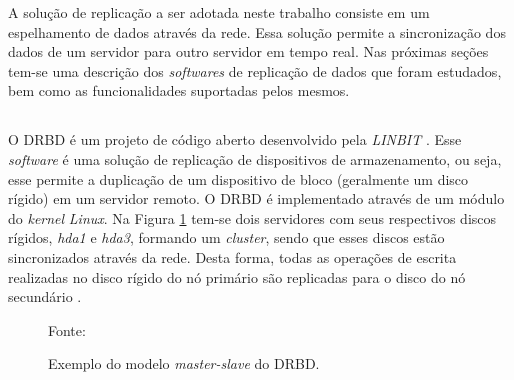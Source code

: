 A solução de replicação a ser adotada neste trabalho consiste em um espelhamento de dados através da rede. Essa solução permite a sincronização 
dos dados de um servidor para outro servidor em tempo real.
Nas próximas seções tem-se uma descrição dos \textit{softwares} de replicação de dados que foram estudados, bem como as funcionalidades 
suportadas pelos mesmos.


\subsection{}
\label{section:drbd}
O \ac{DRBD} é um projeto de código aberto desenvolvido pela \textit{LINBIT} \cite{drbd}.
Esse \textit{software} é uma solução de replicação de dispositivos de armazenamento, ou seja, esse permite a duplicação de um dispositivo de bloco 
(geralmente um disco rígido) em um servidor remoto. O \ac{DRBD} é implementado através de um módulo do \textit{kernel} \textit{Linux}. 
Na Figura \ref{fig:drbd_basic} tem-se dois servidores com seus respectivos discos rígidos, \textit{hda1} e 
\textit{hda3}, formando um \textit{cluster}, sendo que esses discos estão sincronizados através da rede. Desta forma, todas as operações de escrita 
realizadas no disco rígido do nó primário são replicadas para o disco do nó secundário \cite{zaminhani2008}.

\begin{figure}[h!]
 \centering
 \caption{Exemplo do modelo \textit{master-slave} do \ac{DRBD}.}
 Fonte: \citet{jones2010}
 \label{fig:drbd_basic}
\end{figure}

